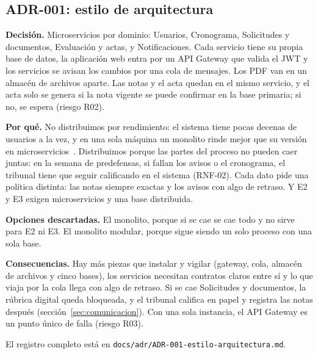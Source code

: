 \subsection{ADR-001: estilo de arquitectura}

\textbf{Decisión.} Microservicios por dominio: Usuarios, Cronograma, Solicitudes y documentos, Evaluación y actas, y Notificaciones. Cada servicio tiene su propia base de datos, la aplicación web entra por un API Gateway que valida el JWT y los servicios se avisan los cambios por una cola de mensajes. Los PDF van en un almacén de archivos aparte. Las notas y el acta quedan en el mismo servicio, y el acta solo se genera si la nota vigente se puede confirmar en la base primaria; si no, se espera (riesgo R02).

\textbf{Por qué.} No distribuimos por rendimiento: el sistema tiene pocas decenas de usuarios a la vez, y en una sola máquina un monolito rinde mejor que su versión en microservicios~\cite{Blinowski2022}. Distribuimos porque las partes del proceso no pueden caer juntas: en la semana de predefensas, si fallan los avisos o el cronograma, el tribunal tiene que seguir calificando en el sistema (RNF-02). Cada dato pide una política distinta: las notas siempre exactas y los avisos con algo de retraso. Y E2 y E3 exigen microservicios y una base distribuida.

\textbf{Opciones descartadas.} El monolito, porque si se cae se cae todo y no sirve para E2 ni E3. El monolito modular, porque sigue siendo un solo proceso con una sola base.

\textbf{Consecuencias.} Hay más piezas que instalar y vigilar (gateway, cola, almacén de archivos y cinco bases), los servicios necesitan contratos claros entre sí y lo que viaja por la cola llega con algo de retraso. Si se cae Solicitudes y documentos, la rúbrica digital queda bloqueada, y el tribunal califica en papel y registra las notas después (sección~\ref{sec:comunicacion}). Con una sola instancia, el API Gateway es un punto único de falla (riesgo R03).

El registro completo está en \nolinkurl{docs/adr/ADR-001-estilo-arquitectura.md}.
